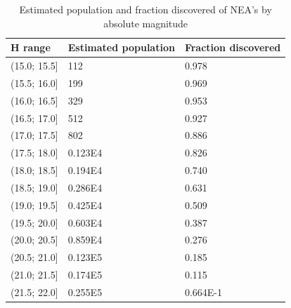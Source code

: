 \begin{table}[htbp]
\centering
\caption{Estimated population and fraction discovered of NEA's by absolute magnitude}
\label{tab:asteroidestimation}
\begin{tabular}{lll}
\textbf{H range} & \textbf{Estimated population} & \textbf{Fraction discovered} \\ \hline \vspace{0.25cm}
(15.0; 15.5{]}   & 112                           & 0.978                        \\ \vspace{0.25cm}
(15.5; 16.0{]}   & 199                           & 0.969                        \\ \vspace{0.25cm}
(16.0; 16.5{]}   & 329                           & 0.953                        \\ \vspace{0.25cm}
(16.5; 17.0{]}   & 512                           & 0.927                        \\ \vspace{0.25cm}
(17.0; 17.5{]}   & 802                           & 0.886                        \\ \vspace{0.25cm}
(17.5; 18.0{]}   & 0.123E4                       & 0.826                        \\ \vspace{0.25cm}
(18.0; 18.5{]}   & 0.194E4                       & 0.740                        \\ \vspace{0.25cm}
(18.5; 19.0{]}   & 0.286E4                       & 0.631                        \\ \vspace{0.25cm}
(19.0; 19.5{]}   & 0.425E4                       & 0.509                        \\ \vspace{0.25cm}
(19.5; 20.0{]}   & 0.603E4                       & 0.387                        \\ \vspace{0.25cm}
(20.0; 20.5{]}   & 0.859E4                       & 0.276                        \\ \vspace{0.25cm}
(20.5; 21.0{]}   & 0.123E5                       & 0.185                        \\ \vspace{0.25cm}
(21.0; 21.5{]}   & 0.174E5                       & 0.115                        \\ \vspace{0.25cm}
(21.5; 22.0{]}   & 0.255E5                       & 0.664E-1                    
\end{tabular}
\end{table}

